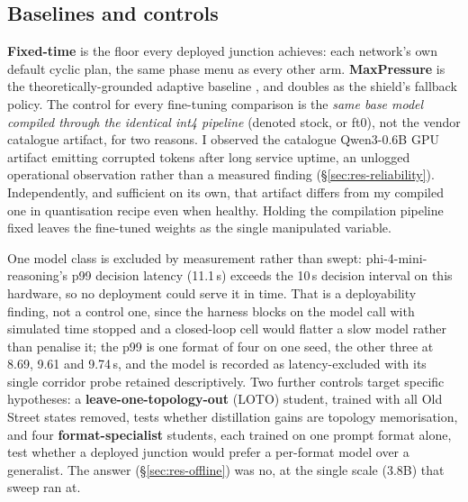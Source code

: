 \subsection{Baselines and controls}\label{sec:met-baselines}
\textbf{Fixed-time} is the floor every deployed junction achieves: each
network's own default cyclic plan, the same phase menu as every other arm.
\textbf{MaxPressure} is the theoretically-grounded adaptive baseline
\cite{varaiya2013maxpressure}, and doubles as the shield's fallback policy.
The control for every fine-tuning comparison is the \emph{same base model
compiled through the identical int4 pipeline} (denoted stock, or ft0), not
the vendor catalogue artifact, for two reasons. I observed the catalogue
Qwen3-0.6B GPU artifact emitting corrupted tokens after long service
uptime, an unlogged operational observation rather than a measured finding
(\S\ref{sec:res-reliability}). Independently, and sufficient on its own,
that artifact differs from my compiled one in quantisation recipe even
when healthy. Holding the compilation pipeline fixed leaves the fine-tuned
weights as the single manipulated variable.

One model class is excluded by measurement rather than swept:
phi-4-mini-reasoning's p99 decision latency (11.1\,s) exceeds the 10\,s
decision interval on this hardware, so no deployment could serve it in
time. That is a deployability finding, not a control one, since the
harness blocks on the model call with simulated time stopped and a
closed-loop cell would flatter a slow model rather than penalise it; the
p99 is one format of four on one seed, the other three at 8.69, 9.61 and
9.74\,s, and the model is recorded as latency-excluded with its single
corridor probe retained descriptively. Two further controls target specific
hypotheses: a \textbf{leave-one-topology-out} (LOTO) student, trained with
all Old Street states removed, tests whether distillation gains are
topology memorisation, and four \textbf{format-specialist} students, each
trained on one prompt format alone, test whether a deployed junction would
prefer a per-format model over a generalist. The answer
(\S\ref{sec:res-offline}) was no, at the single scale (3.8B) that sweep
ran at.
